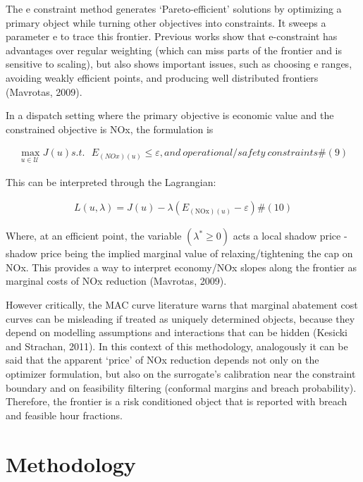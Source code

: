 \documentclass[11pt]{article}
\begin{document}
The e constraint method generates `Pareto-efficient' solutions by
optimizing a primary object while turning other objectives into
constraints. It sweeps a parameter e to trace this frontier. Previous
works show that e-constraint has advantages over regular weighting
(which can miss parts of the frontier and is sensitive to scaling), but
also shows important issues, such as choosing e ranges, avoiding weakly
efficient points, and producing well distributed frontiers (Mavrotas,
2009).

In a dispatch setting where the primary objective is economic value and
the constrained objective is NOx, the formulation is

\[\begin{array}{r}
\max_{u \in \mathcal{U\ }}{J(u)}s.t.{\ \ \ E}_{(NOx)(u)} \leq \varepsilon,and\ operational\text{/}safety\ constraints\#(9)
\end{array}\]

This can be interpreted through the Lagrangian:

\[\begin{array}{r}
L(u,\lambda) = J(u) - \lambda\left( E_{\left( \text{NOx} \right)(u)} - \varepsilon \right)\#(10)
\end{array}\]

Where, at an efficient point, the variable
\(\left( \lambda^{*} \geq 0 \right)\) acts a local shadow price - shadow
price being the implied marginal value of relaxing/tightening the cap on
NOx. This provides a way to interpret economy/NOx slopes along the
frontier as marginal costs of NOx reduction (Mavrotas, 2009).

However critically, the MAC curve literature warns that marginal
abatement cost curves can be misleading if treated as uniquely
determined objects, because they depend on modelling assumptions and
interactions that can be hidden (Kesicki and Strachan, 2011). In this
context of this methodology, analogously it can be said that the
apparent `price' of NOx reduction depends not only on the optimizer
formulation, but also on the surrogate's calibration near the constraint
boundary and on feasibility filtering (conformal margins and breach
probability). Therefore, the frontier is a risk conditioned object that
is reported with breach and feasible hour fractions.

\section{Methodology}\label{methodology}
\end{document}
